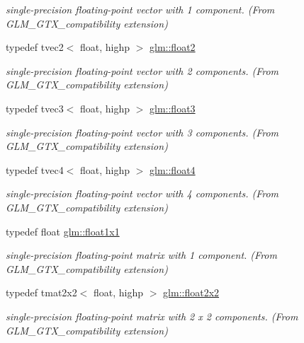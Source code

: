 \begin{DoxyCompactItemize}
\begin{DoxyCompactList}\small\item\em single-\/precision floating-\/point vector with 1 component. (From G\+L\+M\+\_\+\+G\+T\+X\+\_\+compatibility extension) \end{DoxyCompactList}\item 
typedef tvec2$<$ float, highp $>$ \hyperlink{group__gtx__compatibility_ga3174e387d3b89c5dcff485c4e665a68c}{glm\+::float2}
\begin{DoxyCompactList}\small\item\em single-\/precision floating-\/point vector with 2 components. (From G\+L\+M\+\_\+\+G\+T\+X\+\_\+compatibility extension) \end{DoxyCompactList}\item 
typedef tvec3$<$ float, highp $>$ \hyperlink{group__gtx__compatibility_ga25f20d2c12f9b5f3917467e92899ea5a}{glm\+::float3}
\begin{DoxyCompactList}\small\item\em single-\/precision floating-\/point vector with 3 components. (From G\+L\+M\+\_\+\+G\+T\+X\+\_\+compatibility extension) \end{DoxyCompactList}\item 
typedef tvec4$<$ float, highp $>$ \hyperlink{group__gtx__compatibility_ga05e1940d91deb4bbe819881bf65dc52d}{glm\+::float4}
\begin{DoxyCompactList}\small\item\em single-\/precision floating-\/point vector with 4 components. (From G\+L\+M\+\_\+\+G\+T\+X\+\_\+compatibility extension) \end{DoxyCompactList}\item 
typedef float \hyperlink{group__gtx__compatibility_gaac1faa940ac1fbb32d4a315005b578af}{glm\+::float1x1}
\begin{DoxyCompactList}\small\item\em single-\/precision floating-\/point matrix with 1 component. (From G\+L\+M\+\_\+\+G\+T\+X\+\_\+compatibility extension) \end{DoxyCompactList}\item 
typedef tmat2x2$<$ float, highp $>$ \hyperlink{group__gtx__compatibility_ga577dc885086d068647175794909bc026}{glm\+::float2x2}
\begin{DoxyCompactList}\small\item\em single-\/precision floating-\/point matrix with 2 x 2 components. (From G\+L\+M\+\_\+\+G\+T\+X\+\_\+compatibility extension) \end{DoxyCompactList}\item 

\end{DoxyCompactItemize}
